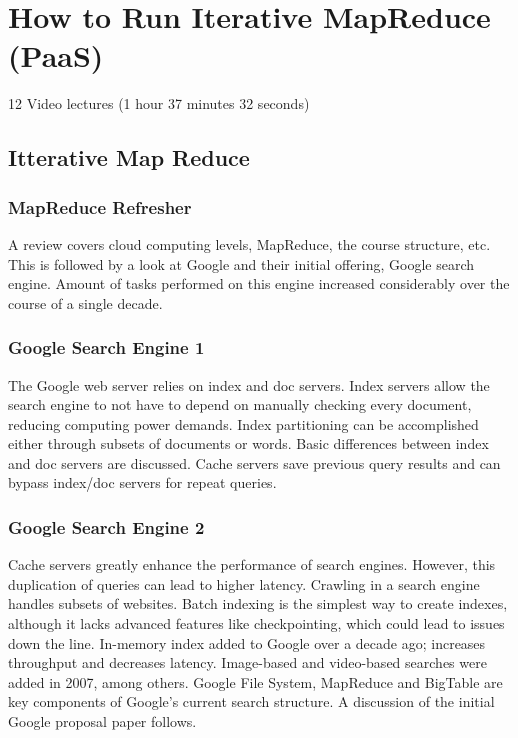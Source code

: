 \part{How to Run Iterative MapReduce (PaaS)}

  12 Video lectures (1 hour 37 minutes 32 seconds)

\chapter{Itterative Map Reduce}

\section{MapReduce Refresher}

A review covers cloud computing levels, MapReduce, the course structure,
etc. This is followed by a look at Google and their initial offering,
Google search engine. Amount of tasks performed on this engine increased
considerably over the course of a single decade.


\section{Google Search Engine 1}

The Google web server relies on index and doc servers. Index servers
allow the search engine to not have to depend on manually checking every
document, reducing computing power demands. Index partitioning can be
accomplished either through subsets of documents or words. Basic
differences between index and doc servers are discussed. Cache servers
save previous query results and can bypass index/doc servers for repeat
queries.



\section{Google Search Engine 2}

Cache servers greatly enhance the performance of search engines.
However, this duplication of queries can lead to higher latency.
Crawling in a search engine handles subsets of websites. Batch indexing
is the simplest way to create indexes, although it lacks advanced
features like checkpointing, which could lead to issues down the line.
In-memory index added to Google over a decade ago; increases throughput
and decreases latency. Image-based and video-based searches were added
in 2007, among others. Google File System, MapReduce and BigTable are
key components of Google's current search structure. A discussion of the
initial Google proposal paper follows.

